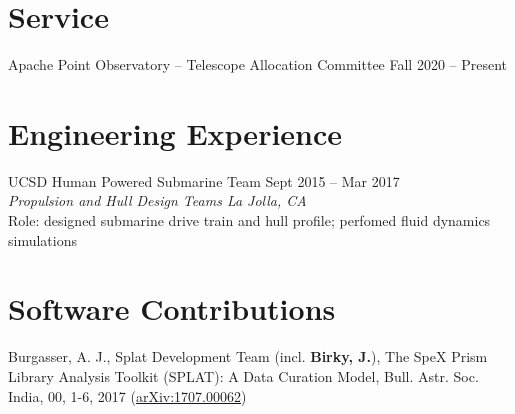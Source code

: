 \documentclass[margin,line]{resume}
\begin{document}
\begin{resume}

\section{\mysidestyle \textcolor{bcolor}{Service}}
Apache Point Observatory -- Telescope Allocation Committee \hfill Fall 2020 -- Present


\section{\mysidestyle \textcolor{bcolor}{Engineering Experience}}
UCSD Human Powered Submarine Team \hfill Sept 2015 -- Mar 2017 \\
\textsl{Propulsion and Hull Design Teams \hfill La Jolla, CA}  \\
Role: designed submarine drive train and hull profile; perfomed fluid dynamics simulations


\section{\mysidestyle \textcolor{bcolor}{Software Contributions}}
Burgasser, A. J., Splat Development Team (incl. \textbf{Birky, J.}), The SpeX Prism Library Analysis Toolkit (SPLAT): A Data Curation Model, Bull. Astr. Soc. India, 00, 1-6, 2017 (\href{https://arxiv.org/abs/1707.00062}{arXiv:1707.00062})



\end{resume}
\end{document}
